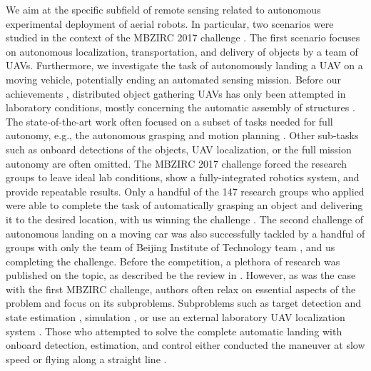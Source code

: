 \documentclass[a4paper,11pt,twoside,openright]{book}
\begin{document}
We aim at the specific subfield of remote sensing related to autonomous experimental deployment of aerial robots.
In particular, two scenarios were studied in the context of the \ac{MBZIRC} 2017 challenge \cite{dias2019journal}.
The first scenario focuses on autonomous localization, transportation, and delivery of objects by a team of \acp{UAV}.
Furthermore, we investigate the task of autonomously landing a \ac{UAV} on a moving vehicle, potentially ending an automated sensing mission.
Before our achievements \cite{loianno2018localization, spurny2019cooperative}, distributed object gathering \acp{UAV} has only been attempted in laboratory conditions, mostly concerning the automatic assembly of structures \cite{mirjan2016building, alejo2014collisionfree, augugliaro2014flight, lindsey2013distributed}.
The state-of-the-art work often focused on a subset of tasks needed for full autonomy, e.g., the autonomous grasping \cite{gawel2017aerial, thomas2014toward} and motion planning \cite{alejo2014collisionfree}.
Other sub-tasks such as onboard detections of the objects, \ac{UAV} localization, or the full mission autonomy are often omitted.
The \ac{MBZIRC} 2017 challenge forced the research groups to leave ideal lab conditions, show a fully-integrated robotics system, and provide repeatable results.
Only a handful of the 147 research groups who applied \cite{beul2019team, bahnemann2019eth, lee2019mission, castano2019robotics} were able to complete the task of automatically grasping an object and delivering it to the desired location, with us winning the challenge \cite{spurny2019cooperative}.
The second challenge of autonomous landing on a moving car was also successfully tackled by a handful of groups \cite{beul2017fast,  li2019fast, battiato2017system, cantelli2017autonomous, jin2019ellipse} with only the team of Beijing Institute of Technology team \cite{jin2019ellipse}, and us \cite{baca2019autonomous} completing the challenge.
Before the competition, a plethora of research was published on the topic, as described be the review in \cite{jin2016onboard}.
However, as was the case with the first \ac{MBZIRC} challenge, authors often relax on essential aspects of the problem and focus on its subproblems.
Subproblems such as target detection and state estimation \cite{benini2016real, lin2017monocular}, simulation \cite{jung2015close, jung2016target, ghommam2017autonomous}, or use an external laboratory \ac{UAV} localization system \cite{ghamry2016real, lee2012autonomous, hui2013autonomous}.
Those who attempted to solve the complete automatic landing with onboard detection, estimation, and control either conducted the maneuver at slow speed \cite{hoang2017vision} or flying along a straight line \cite{borowczyk2017autonomous}.
\end{document}
